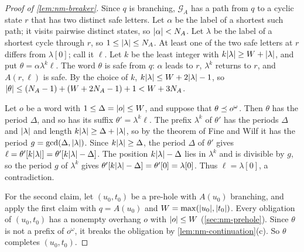 \begin{proof}[Proof of \cref{lem:nm-breaker}]
Since $q$ is branching, $\mathcal G_A$ has a path from $q$ to a cyclic state
$r$ that has two distinct safe letters. Let $\alpha$ be the label of a shortest
such path; it visits pairwise distinct states, so $\lvert \alpha\rvert<N_A$. Let
$\lambda$ be the label of a shortest cycle through $r$, so
$1\le\lvert \lambda\rvert\le N_A$. At least one of the two safe letters at $r$ differs
from $\lambda[0]$; call it $\ell$. Let $k$ be the least integer with
$k\lvert \lambda\rvert\ge W+\lvert \lambda\rvert$, and put $\theta=\alpha\lambda^k\ell$. The word
$\theta$ is safe from $q$: $\alpha$ leads to $r$, $\lambda^k$ returns to $r$,
and $A(r,\ell)$ is safe. By the choice of $k$,
$k\lvert \lambda\rvert\le W+2\lvert \lambda\rvert-1$, so
$\lvert \theta\rvert\le(N_A-1)+(W+2N_A-1)+1<W+3N_A$.

Let $o$ be a word with $1\le\Delta=\lvert o\rvert\le W$, and suppose that
$\theta\preceq o^\omega$. Then $\theta$ has the period $\Delta$, and so has its
suffix $\theta'=\lambda^k\ell$. The prefix $\lambda^k$ of $\theta'$ has the
periods $\Delta$ and $\lvert \lambda\rvert$ and length
$k\lvert \lambda\rvert\ge\Delta+\lvert \lambda\rvert$, so by the theorem of Fine and Wilf it has
the period $g=\gcd(\Delta,\lvert \lambda\rvert)$. Since $k\lvert \lambda\rvert\ge\Delta$, the
period $\Delta$ of $\theta'$ gives
$\ell=\theta'[k\lvert \lambda\rvert]=\theta'[k\lvert \lambda\rvert-\Delta]$. The position
$k\lvert \lambda\rvert-\Delta$ lies in $\lambda^k$ and is divisible by $g$, so the
period $g$ of $\lambda^k$ gives $\theta'[k\lvert \lambda\rvert-\Delta]=\theta'[0]=\lambda[0]$.
Thus $\ell=\lambda[0]$, a contradiction.

For the second claim, let $(u_0,t_0)$ be a pre-hole with $A(u_0)$ branching,
and apply the first claim with $q=A(u_0)$ and $W=\max(\lvert u_0\rvert,\lvert t_0\rvert)$.
Every obligation of $(u_0,t_0)$ has a nonempty overhang $o$ with
$\lvert o\rvert\le W$ (\cref{sec:nm-prehole}). Since $\theta$ is not a prefix of
$o^\omega$, it breaks the obligation by \cref{lem:nm-continuation}(c). So
$\theta$ completes $(u_0,t_0)$.
\end{proof}

